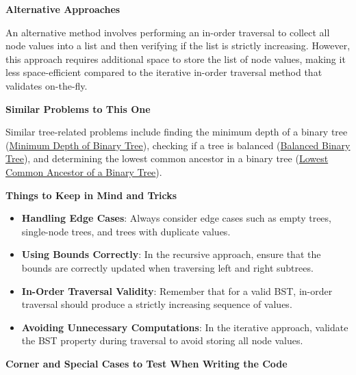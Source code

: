 \textbf{Alternative Approaches}

An alternative method involves performing an in-order traversal to collect all node values into a list and then verifying if the list is strictly increasing. However, this approach requires additional space to store the list of node values, making it less space-efficient compared to the iterative in-order traversal method that validates on-the-fly.

\textbf{Similar Problems to This One}

Similar tree-related problems include finding the minimum depth of a binary tree (\hyperref[problem:minimum_depth_of_binary_tree]{Minimum Depth of Binary Tree}), checking if a tree is balanced (\hyperref[problem:balanced_binary_tree]{Balanced Binary Tree}), and determining the lowest common ancestor in a binary tree (\hyperref[problem:lowest_common_ancestor_of_a_binary_tree]{Lowest Common Ancestor of a Binary Tree}).

\textbf{Things to Keep in Mind and Tricks}

\begin{itemize}
    \item \textbf{Handling Edge Cases}: Always consider edge cases such as empty trees, single-node trees, and trees with duplicate values.
    \item \textbf{Using Bounds Correctly}: In the recursive approach, ensure that the bounds are correctly updated when traversing left and right subtrees.
    \item \textbf{In-Order Traversal Validity}: Remember that for a valid BST, in-order traversal should produce a strictly increasing sequence of values.
    \item \textbf{Avoiding Unnecessary Computations}: In the iterative approach, validate the BST property during traversal to avoid storing all node values.
\end{itemize}

\textbf{Corner and Special Cases to Test When Writing the Code}

